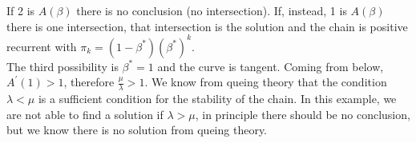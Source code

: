 If 2 is $A(\beta)$ there is no conclusion (no intersection). If, instead, 1 is $A(\beta)$ there is one intersection, that intersection is the solution and the chain is positive recurrent with $\pi_k = (1-\beta^*)(\beta^*)^k$.\\
The third possibility is $\beta^* = 1$ and the curve is tangent. Coming from below, $A^{'}(1)>1$, therefore $\frac{\mu}{\lambda}>1$. We know from queing theory that the condition $\lambda < \mu$ is a sufficient condition for the stability of the chain. In this example, we are not able to find a solution if $\lambda > \mu$, in principle there should be no conclusion, but we know there is no solution from queing theory.
